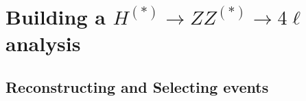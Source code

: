 

\section{Building a $H^{(*)} \to ZZ^{(*)} \to 4\ell$ analysis}

\subsection{Reconstructing and Selecting events} \label{sec:recoandsel}



